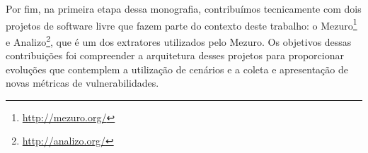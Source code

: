 	
Por fim, na primeira etapa dessa monografia, contribuímos tecnicamente com dois projetos de software livre que fazem parte do contexto deste trabalho: o Mezuro\footnote{\url{http://mezuro.org/}} e Analizo\footnote{\url{http://analizo.org/}}, que é um dos extratores utilizados pelo Mezuro. Os objetivos dessas contribuições foi compreender a arquitetura desses projetos para proporcionar evoluções que contemplem a utilização de cenários e a coleta e apresentação de novas métricas de vulnerabilidades.
